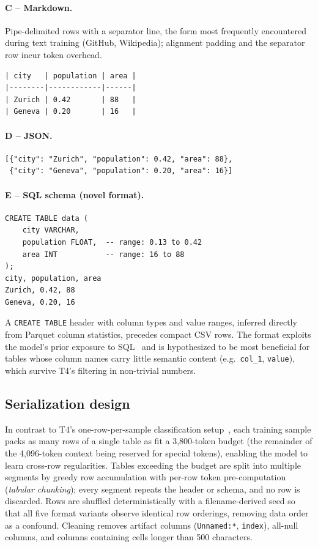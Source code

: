 \documentclass[11pt,a4paper]{article}
\begin{document}
\paragraph{C -- Markdown.} Pipe-delimited rows with a separator line, the form most frequently encountered during text training (GitHub, Wikipedia); alignment padding and the separator row incur token overhead.\mbox{}
\begin{lstlisting}
| city   | population | area |
|--------|------------|------|
| Zurich | 0.42       | 88   |
| Geneva | 0.20       | 16   |
\end{lstlisting}
\paragraph{D -- JSON.}\mbox{}
\begin{lstlisting}
[{"city": "Zurich", "population": 0.42, "area": 88},
 {"city": "Geneva", "population": 0.20, "area": 16}]
\end{lstlisting}
\paragraph{E -- SQL schema (novel format).}\mbox{}
\begin{lstlisting}
CREATE TABLE data (
    city VARCHAR,
    population FLOAT,  -- range: 0.13 to 0.42
    area INT           -- range: 16 to 88
);
city, population, area
Zurich, 0.42, 88
Geneva, 0.20, 16
\end{lstlisting}
A \texttt{CREATE TABLE} header with column types and value ranges, inferred directly from Parquet column statistics, precedes compact CSV rows. The format exploits the model's prior exposure to SQL~\cite{spider} and is hypothesized to be most beneficial for tables whose column names carry little semantic content (e.g.\ \texttt{col\_1}, \texttt{value}), which survive T4's filtering in non-trivial numbers.
\subsection{Serialization design}
In contrast to T4's one-row-per-sample classification setup~\cite{t4}, each training sample packs as many rows of a single table as fit a 3{,}800-token budget (the remainder of the 4{,}096-token context being reserved for special tokens), enabling the model to learn cross-row regularities. Tables exceeding the budget are split into multiple segments by greedy row accumulation with per-row token pre-computation (\emph{tabular chunking}); every segment repeats the header or schema, and no row is discarded. Rows are shuffled deterministically with a filename-derived seed so that all five format variants observe identical row orderings, removing data order as a confound. Cleaning removes artifact columns (\texttt{Unnamed:*}, \texttt{index}), all-null columns, and columns containing cells longer than 500 characters.
\end{document}
